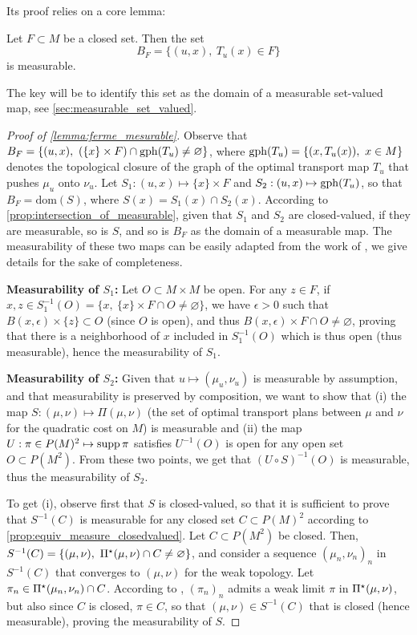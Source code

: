 \noindent Its proof relies on a core lemma:

\begin{lemma}\label{lemma:ferme_mesurable}
    Let $F \subset M$ be a closed set. Then the set
    \[ B_F = \{ (u,x),\ T_u(x) \in F \} \]
    is measurable.
\end{lemma}

\noindent The key will be to identify this set as the domain of a measurable set-valued map, see \cref{sec:measurable_set_valued}.

\begin{proof}[Proof of \cref{lemma:ferme_mesurable}]
Observe that $B_F = \{(u,x),\ (\{x\} \times F) \cap \mathrm{gph}(T_u) \neq \varnothing\}$, where $\mathrm{gph}(T_u) = \{(x,T_u(x)),\ x \in M\}$ denotes the topological closure of the graph of the optimal transport map $T_u$ that pushes $\mu_u$ onto $\nu_u$.
Let $S_1 : (u,x) \mapsto \{x\} \times F$ and $S_2 : (u,x) \mapsto \mathrm{gph}(T_u)$, so that $B_F = \mathrm{dom}(S)$, where $S(x) = S_1(x) \cap S_2(x)$. According to \cref{prop:intersection_of_measurable}, given that $S_1$ and $S_2$ are closed-valued, if they are measurable, so is $S$, and so is $B_F$ as the domain of a measurable map. The measurability of these two maps can be easily adapted from the work of \cite{fontbona2010measurability}, we give details for the sake of completeness.

\textbf{Measurability of $S_1$:} Let $O \subset M \times M$ be open. For any $z \in F$, if $x,z \in S_1^{-1}(O) = \{x,\ \{x\} \times F \cap O \neq \varnothing \}$, we have $\epsilon > 0$ such that $B(x,\epsilon) \times \{z\} \subset O$ (since $O$ is open), and thus $B(x,\epsilon) \times F \cap O \neq \varnothing$, proving that there is a neighborhood of $x$ included in $S_1^{-1}(O)$ which is thus open (thus measurable), hence the measurability of $S_1$.

\textbf{Measurability of $S_2$:} Given that $u \mapsto (\mu_u,\nu_u)$ is measurable by assumption, and that measurability is preserved by composition, we want to show that (i) the map $S : (\mu,\nu) \mapsto \Pi(\mu,\nu)$ (the set of optimal transport plans between $\mu$ and $\nu$ for the quadratic cost on $M$) is measurable and (ii) the map $U : \pi \in P(M)^2 \mapsto \operatorname{supp}\pi$ satisfies $U^{-1}(O)$ is open for any open set $O \subset P(M^2)$. From these two points, we get that $(U \circ S)^{-1}(O)$ is measurable, thus the measurability of $S_2$.

To get (i), observe first that $S$ is closed-valued, so that it is sufficient to prove that $S^{-1}(C)$ is measurable for any closed set $C \subset P(M)^2$ according to \cref{prop:equiv_measure_closedvalued}. Let $C \subset P(M^2)$ be closed. Then, $S^{-1}(C) = \{(\mu,\nu),\ \Pi\opt(\mu,\nu) \cap C \neq \varnothing \}$, and consider a sequence $(\mu_n, \nu_n)_n$ in $S^{-1}(C)$ that converges to $(\mu,\nu)$ for the weak topology. Let $\pi_n \in \Pi^\star(\mu_n,\nu_n) \cap C$. According to \cite[Thm.~5.20]{villani2009optimal}, $(\pi_n)_n$ admits a weak limit $\pi$ in $\Pi^\star(\mu,\nu)$, but also since $C$ is closed, $\pi \in C$, so that $(\mu,\nu) \in S^{-1}(C)$ that is closed (hence measurable), proving the measurability of $S$.


\end{proof}
